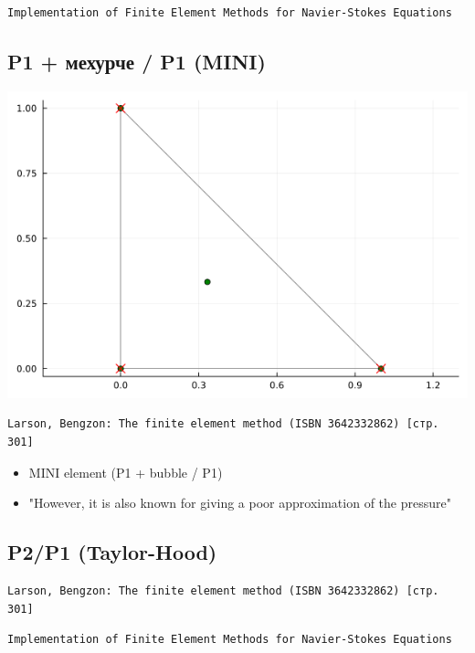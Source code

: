 \documentclass[fleqn,12pt]{article}
\begin{document}
\begin{verbatim}
Implementation of Finite Element Methods for Navier-Stokes Equations
\end{verbatim}

\subsection{P1 + мехурче / P1 (MINI)}
\includegraphics[width=140mm]{img/mini.png}
\begin{verbatim}
Larson, Bengzon: The finite element method (ISBN 3642332862) [стр. 301] 
\end{verbatim}
\begin{itemize}
    \item MINI element (P1 + bubble / P1)
    \item "However, it is also known for giving a poor approximation of the pressure"
\end{itemize}


\subsection{P2/P1 (Taylor-Hood)}
\begin{verbatim}
Larson, Bengzon: The finite element method (ISBN 3642332862) [стр. 301] 
\end{verbatim}
\begin{verbatim}
Implementation of Finite Element Methods for Navier-Stokes Equations
\end{verbatim}
\end{document}

